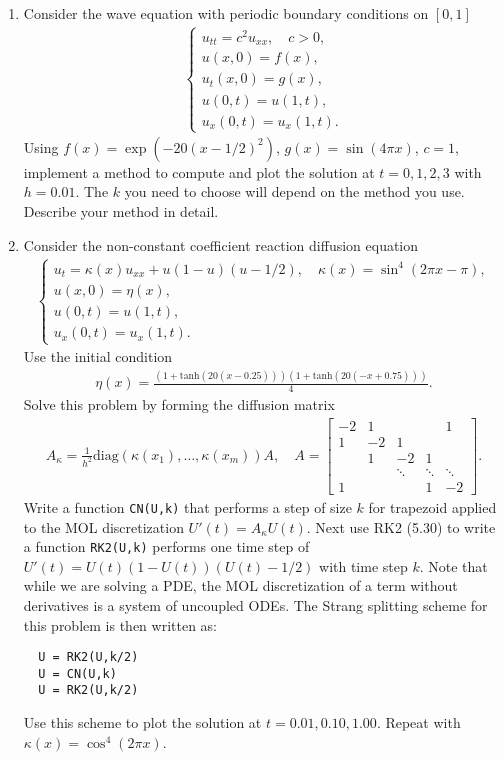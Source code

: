 \documentclass[10pt]{amsart}
\begin{document}
\begin{enumerate}[label={\bf Problem~{\arabic*}:}]
\mline
\item Consider the wave equation with periodic boundary conditions on $[0,1]$
  \begin{align*}
    \begin{cases}
      u_{tt} = c^2 u_{xx}, \quad c > 0,\\
      u(x,0) = f(x),\\
      u_t(x,0) = g(x),\\
      u(0,t) = u(1,t),\\
      u_x(0,t) = u_x(1,t).
    \end{cases}
  \end{align*}
  Using $f(x) = \exp( -20(x-1/2)^2 )$, $g(x) = \sin(4\pi x)$, $c = 1$, implement a method to compute and plot the solution at $t = 0,1,2,3$ with $h = 0.01$.  The $k$ you need to choose will depend on the method you use.  Describe your method in detail.

\mline
\item Consider the non-constant coefficient reaction diffusion equation
  \begin{align*}
    \begin{cases}
      u_t = \kappa(x) u_{xx} + u(1-u)(u-1/2), \quad \kappa(x) = \sin^4(2\pi x - \pi),\\
      u(x,0) = \eta(x),\\
      u(0,t) = u(1,t),\\
      u_x(0,t) = u_x(1,t).
    \end{cases}
  \end{align*}
  Use the initial condition
  \begin{align*}
    \eta(x) = \frac{ ( 1 + \mathrm{tanh}(20(x-0.25)) ) ( 1 + \mathrm{tanh}(20(-x+0.75)))}{4}.
  \end{align*}
  Solve this problem by forming the diffusion matrix
  \begin{align*}
    A_{\kappa} = \frac{1}{h^2} \mathrm{diag}(\kappa(x_1),\ldots,\kappa(x_m)) A, \quad A  = \begin{bmatrix}
-2  & 1 &&& 1\\
1 & -2 & 1 \\
& 1 & -2 & 1\\
&& \ddots & \ddots & \ddots \\
1&&& 1 & -2 \end{bmatrix}.
  \end{align*}
  Write a function {\tt CN(U,k)} that performs a step of size $k$ for trapezoid applied to the MOL discretization $U'(t) = A_{\kappa} U(t)$.  Next use RK2 (5.30) to write a function {\tt RK2(U,k)} performs one time step of $U'(t) = U(t)(1-U(t))(U(t) - 1/2)$ with time step $k$.  Note that while we are solving a PDE, the MOL discretization of a term without derivatives is a system of uncoupled ODEs.  The Strang splitting scheme for this problem is then written as:
\begin{verbatim}
  U = RK2(U,k/2)
  U = CN(U,k)
  U = RK2(U,k/2)
\end{verbatim}
Use this scheme to plot the solution at $t = 0.01,0.10,1.00$.  Repeat with $\kappa(x) = \cos^4(2\pi x)$.




\end{enumerate}
\end{document}
